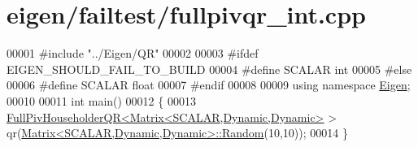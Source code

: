\hypertarget{eigen_2failtest_2fullpivqr__int_8cpp_source}{}\section{eigen/failtest/fullpivqr\+\_\+int.cpp}
\label{eigen_2failtest_2fullpivqr__int_8cpp_source}

\begin{DoxyCode}
00001 \textcolor{preprocessor}{#include "../Eigen/QR"}
00002 
00003 \textcolor{preprocessor}{#ifdef EIGEN\_SHOULD\_FAIL\_TO\_BUILD}
00004 \textcolor{preprocessor}{#define SCALAR int}
00005 \textcolor{preprocessor}{#else}
00006 \textcolor{preprocessor}{#define SCALAR float}
00007 \textcolor{preprocessor}{#endif}
00008 
00009 \textcolor{keyword}{using namespace }\hyperlink{namespace_eigen}{Eigen};
00010 
00011 \textcolor{keywordtype}{int} main()
00012 \{
00013   \hyperlink{group___q_r___module_class_eigen_1_1_full_piv_householder_q_r}{FullPivHouseholderQR<Matrix<SCALAR,Dynamic,Dynamic>} > 
      qr(\hyperlink{group___core___module_class_eigen_1_1_matrix}{Matrix<SCALAR,Dynamic,Dynamic>::Random}(10,10));
00014 \}
\end{DoxyCode}
